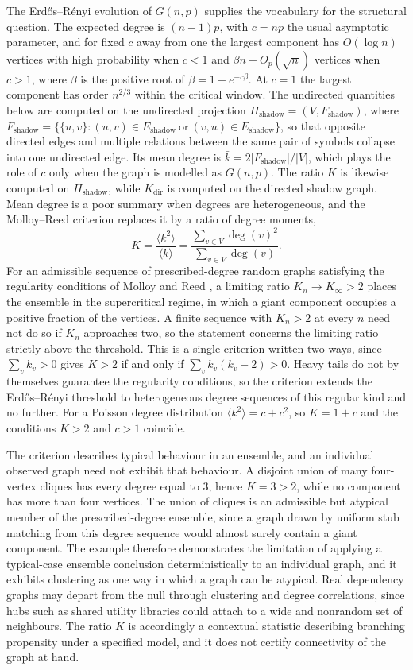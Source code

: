 \documentclass[11pt]{article}
\newcommand{\Esh}{E_{\mathrm{shadow}}}
\begin{document}
The Erd\H{o}s--R\'enyi evolution of $G(n,p)$ \cite{ErdosRenyi1960} supplies the vocabulary for the structural question. The expected degree is $(n-1)p$, with $c=np$ the usual asymptotic parameter, and for fixed $c$ away from one the largest component has $O(\log n)$ vertices with high probability when $c<1$ and $\beta n+O_p(\sqrt{n})$ vertices when $c>1$, where $\beta$ is the positive root of $\beta=1-e^{-c\beta}$. At $c=1$ the largest component has order $n^{2/3}$ within the critical window. The undirected quantities below are computed on the undirected projection $H_{\mathrm{shadow}}=(V,F_{\mathrm{shadow}})$, where $F_{\mathrm{shadow}}=\{\{u,v\}:(u,v)\in\Esh\ \text{or}\ (v,u)\in\Esh\}$, so that opposite directed edges and multiple relations between the same pair of symbols collapse into one undirected edge. Its mean degree is $\bar k=2|F_{\mathrm{shadow}}|/|V|$, which plays the role of $c$ only when the graph is modelled as $G(n,p)$. The ratio $K$ is likewise computed on $H_{\mathrm{shadow}}$, while $K_{\mathrm{dir}}$ is computed on the directed shadow graph. Mean degree is a poor summary when degrees are heterogeneous, and the Molloy--Reed criterion replaces it by a ratio of degree moments,
\[
K=\frac{\langle k^{2}\rangle}{\langle k\rangle}=\frac{\sum_{v\in V}\deg(v)^{2}}{\sum_{v\in V}\deg(v)}.
\]
For an admissible sequence of prescribed-degree random graphs satisfying the regularity conditions of Molloy and Reed \cite{MolloyReed1995}, a limiting ratio $K_n\to K_\infty>2$ places the ensemble in the supercritical regime, in which a giant component occupies a positive fraction of the vertices. A finite sequence with $K_n>2$ at every $n$ need not do so if $K_n$ approaches two, so the statement concerns the limiting ratio strictly above the threshold. This is a single criterion written two ways, since $\sum_v k_v>0$ gives $K>2$ if and only if $\sum_v k_v(k_v-2)>0$. Heavy tails do not by themselves guarantee the regularity conditions, so the criterion extends the Erd\H{o}s--R\'enyi threshold to heterogeneous degree sequences of this regular kind and no further. For a Poisson degree distribution $\langle k^2\rangle=c+c^2$, so $K=1+c$ and the conditions $K>2$ and $c>1$ coincide.

The criterion describes typical behaviour in an ensemble, and an individual observed graph need not exhibit that behaviour. A disjoint union of many four-vertex cliques has every degree equal to $3$, hence $K=3>2$, while no component has more than four vertices. The union of cliques is an admissible but atypical member of the prescribed-degree ensemble, since a graph drawn by uniform stub matching from this degree sequence would almost surely contain a giant component. The example therefore demonstrates the limitation of applying a typical-case ensemble conclusion deterministically to an individual graph, and it exhibits clustering as one way in which a graph can be atypical. Real dependency graphs may depart from the null through clustering and degree correlations, since hubs such as shared utility libraries could attach to a wide and nonrandom set of neighbours. The ratio $K$ is accordingly a contextual statistic describing branching propensity under a specified model, and it does not certify connectivity of the graph at hand.
\end{document}
